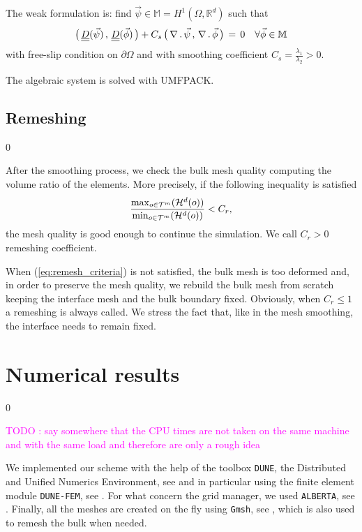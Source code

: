 \documentclass[a4paper,12pt,onecolumn]{article}
\newcommand{\R}{{\mathbb R}}
\newcommand{\sigmaO}{o}
\newcommand{\mat}[1]{\underline{\underline{#1}}\rule{0pt}{0pt}}
\begin{document}
The weak formulation is: find $\vec\psi\in \mathbb{M}= H^1(\Omega, \R^d)$ such that
\begin{equation}
\big(\,\mat D(\vec\psi)\,,\,\mat D (\vec \phi)\,\big)+ C_s\,\big(\,
\nabla\,.\,\vec \psi\,,\,\nabla\,.\,\vec\phi\,\big)\, =\, 0\quad \forall \vec
\phi \in\mathbb{M}
\end{equation}
with free-slip condition on $\partial\Omega$ and with smoothing coefficient
$C_s=\frac{\lambda_1}{\lambda_2}>0$.

The algebraic system is solved with UMFPACK.

\subsection{Remeshing} \label{subsec:remeshing}
\setcounter{equation} 0

After the smoothing process, we check the bulk mesh quality computing the
volume ratio of the elements. More precisely, if the following inequality is
satisfied
\begin{equation}\label{eq:remesh_criteria}
\frac{\max_{\sigmaO\in {\cal
T}^m}(\mathcal{H}^{d}(\sigmaO))}{\min_{\sigmaO\in\mathcal
{T}^m}(\mathcal{H}^{d}(\sigmaO))}<C_r,
\end{equation}
the mesh quality is good enough to continue the simulation. We call $C_r>0$
remeshing coefficient.

When (\ref{eq:remesh_criteria}) is not satisfied, the bulk mesh is too deformed
and, in order to preserve the mesh quality, we rebuild the bulk mesh from
scratch keeping the interface mesh and the bulk boundary fixed. Obviously, when
$C_r\leq 1$ a remeshing is always called. We stress the fact that, like in the
mesh smoothing, the interface needs to remain fixed.

\section{Numerical results} \label{sec:numerical_results}
\setcounter{equation} 0

\textcolor{magenta}{TODO : say somewhere that the CPU times are not taken on
the same machine and with the same load and therefore are only a rough idea}

We implemented our scheme with the help of the toolbox \verb|DUNE|, the
Distributed and Unified Numerics Environment, see
\cite{ISTL,ISTLParallel,dunegridpaperI08,dunegridpaperII08,dune-web-page} and in
particular using the finite element module \verb|DUNE-FEM|, see
\cite{dunefempaper10,dunefem-web-page}. For what concern the grid manager, we
used \verb|ALBERTA|, see \cite{Alberta,alberta-web-page}. Finally, all the
meshes are created on the fly using \verb|Gmsh|, see
\cite{GeuzaineR09,gmsh-web-page}, which is also used to remesh the bulk when
needed.
\end{document}
